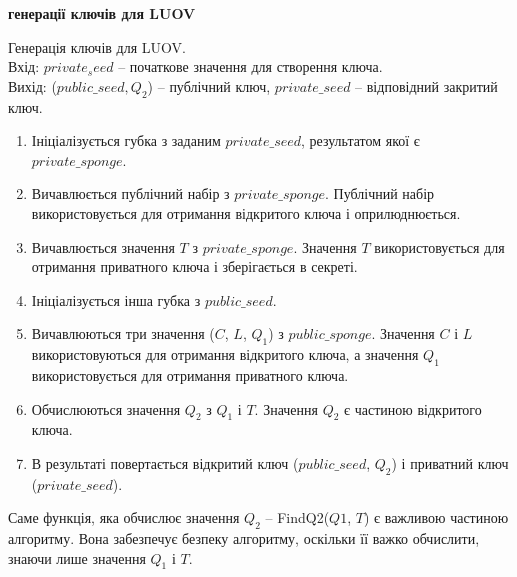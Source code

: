 \newpage
\textbf{ генерації ключів для LUOV}
\vspace{0.25cm}
 \begin{algorithm}
    Генерація ключів для LUOV. \\Вхід: $private_seed$ -- початкове значення для створення ключа. \\Вихід: ($public\_seed, Q_2$) -- публічний ключ, $private\_seed$ -- відповідний закритий ключ.
    \begin{enumerate}
        \item Ініціалізується губка з заданим $private\_seed$, результатом якої є $private\_sponge$. 
        \item Вичавлюється публічний набір з $private\_sponge$. Публічний набір використовується для отримання відкритого ключа і оприлюднюється.
        \item Вичавлюється значення $T$ з $private\_sponge$. Значення $T$ використовується для отримання приватного ключа і зберігається в секреті.
        \item Ініціалізується інша губка з $public\_seed$.
        \item Вичавлюються три значення ($C$, $L$, $Q_1$) з $public\_sponge$. Значення $C$ і $L$ використовуються для отримання відкритого ключа, а значення $Q_1$ використовується для отримання приватного ключа.
        \item Обчислюються значення $Q_2$ з $Q_1$ і $T$. Значення $Q_2$ є частиною відкритого ключа.
        \item В результаті повертається відкритий ключ ($public\_seed$, $Q_2$) і приватний ключ ($private\_seed$).
    \end{enumerate}
\end{algorithm}

Саме функція, яка обчислює значення $Q_2$ -- FindQ2($Q1$, $T$) є важливою частиною алгоритму. Вона забезпечує безпеку алгоритму, оскільки її важко обчислити, знаючи лише значення $Q_1$ і $T$.

